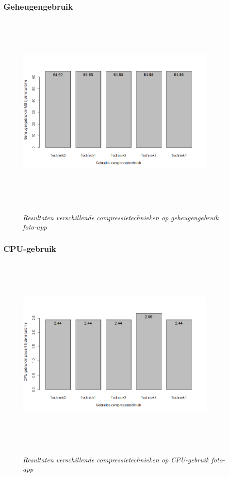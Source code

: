 \subsubsection{Geheugengebruik}
\begin{figure}[H]
	\centering
	\caption{\textit{Resultaten verschillende compressietechnieken op geheugengebruik foto-app}}
	\includegraphics[width=10cm, height=10cm, keepaspectratio]{img/Rplot03}\\[.5cm]
	
\end{figure}
\subsubsection{CPU-gebruik}
\begin{figure}[H]
	\centering
	\caption{\textit{Resultaten verschillende compressietechnieken op CPU-gebruik foto-app}}
	\includegraphics[width=10cm, height=10cm, keepaspectratio]{img/app1cpu}\\[.5cm]
	
\end{figure}
